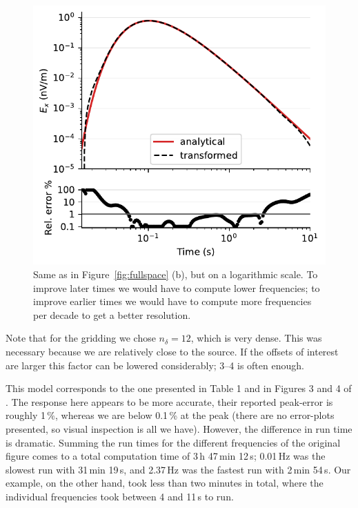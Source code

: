 \documentclass[extra, camera,%
    onecolumn,   %
    referee,     %
]{gji}
\newlength{\cwidth}
\begin{document}
\begin{figure}
  \centering
  \includegraphics[width=\cwidth]{05-fullspace-log}
  \caption{Same as in Figure~\ref{fig:fullspace} (b), but on a logarithmic
    scale. To improve later times we would have to compute lower frequencies;
    to improve earlier times we would have to compute more frequencies per
    decade to get a better resolution.}
  \label{fig:fullspace-log}
\end{figure}
%
Note that for the gridding we chose $n_\delta=12$, which is very dense. This
was necessary because we are relatively close to the source. If the offsets of
interest are larger this factor can be lowered considerably; 3--4 is often
enough.

This model corresponds to the one presented in Table 1 and in Figures 3 and 4
of \cite{GEO.08.Mulder}. The response here appears to be more accurate, their
reported peak-error is roughly 1\,\%, whereas we are below 0.1\,\% at the peak
(there are no error-plots presented, so visual inspection is all we have).
However, the difference in run time is dramatic. Summing the run times for the
different frequencies of the original figure comes to a total computation time
of 3\,h 47\,min 12\,s; 0.01\,Hz was the slowest run with 31\,min 19\,s, and
2.37\,Hz was the fastest run with 2\,min 54\,s. Our example, on the other hand,
took less than two minutes in total, where the individual frequencies took
between 4 and 11\,s to run.
\end{document}
